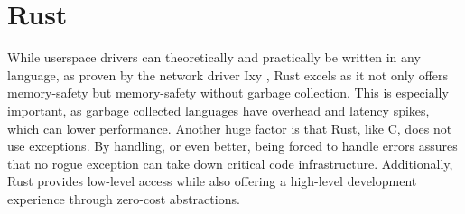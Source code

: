 \section{Rust}
While userspace drivers can theoretically and practically be written in any language, as proven by the network driver Ixy \cite{ixylanggithub}, Rust excels as it not only offers memory-safety but memory-safety without garbage collection. This is especially important, as garbage collected languages have overhead and latency spikes, which can lower performance. Another huge factor is that Rust, like C, does not use exceptions. By handling, or even better, being forced to handle errors assures that no rogue exception can take down critical code infrastructure.
Additionally, Rust provides low-level access while also offering a high-level development experience through zero-cost abstractions.